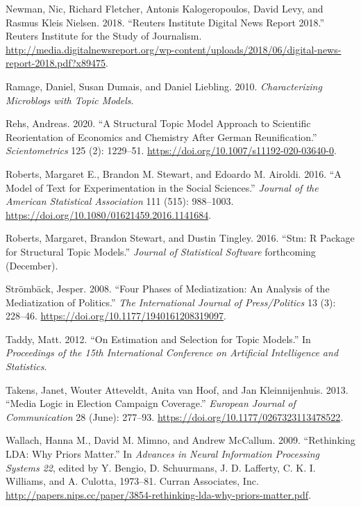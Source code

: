 \documentclass[
]{article}
\begin{document}
\leavevmode\hypertarget{ref-newman_reuters_2018}{}%
Newman, Nic, Richard Fletcher, Antonis Kalogeropoulos, David Levy, and
Rasmus Kleis Nielsen. 2018. ``Reuters Institute Digital News Report
2018.'' Reuters Institute for the Study of Journalism.
\url{http://media.digitalnewsreport.org/wp-content/uploads/2018/06/digital-news-report-2018.pdf?x89475}.

\leavevmode\hypertarget{ref-ramage_characterizing_2010}{}%
Ramage, Daniel, Susan Dumais, and Daniel Liebling. 2010.
\emph{Characterizing Microblogs with Topic Models}.

\leavevmode\hypertarget{ref-rehs_structural_2020}{}%
Rehs, Andreas. 2020. ``A Structural Topic Model Approach to Scientific
Reorientation of Economics and Chemistry After German Reunification.''
\emph{Scientometrics} 125 (2): 1229--51.
\url{https://doi.org/10.1007/s11192-020-03640-0}.

\leavevmode\hypertarget{ref-roberts_model_2016}{}%
Roberts, Margaret E., Brandon M. Stewart, and Edoardo M. Airoldi. 2016.
``A Model of Text for Experimentation in the Social Sciences.''
\emph{Journal of the American Statistical Association} 111 (515):
988--1003. \url{https://doi.org/10.1080/01621459.2016.1141684}.

\leavevmode\hypertarget{ref-roberts_stm:_2016}{}%
Roberts, Margaret, Brandon Stewart, and Dustin Tingley. 2016. ``Stm: R
Package for Structural Topic Models.'' \emph{Journal of Statistical
Software} forthcoming (December).

\leavevmode\hypertarget{ref-stromback_four_2008}{}%
Strömbäck, Jesper. 2008. ``Four Phases of Mediatization: An Analysis of
the Mediatization of Politics.'' \emph{The International Journal of
Press/Politics} 13 (3): 228--46.
\url{https://doi.org/10.1177/1940161208319097}.

\leavevmode\hypertarget{ref-taddy_estimation_2012}{}%
Taddy, Matt. 2012. ``On Estimation and Selection for Topic Models.'' In
\emph{Proceedings of the 15th International Conference on Artificial
Intelligence and Statistics}.

\leavevmode\hypertarget{ref-takens_media_2013}{}%
Takens, Janet, Wouter Atteveldt, Anita van Hoof, and Jan Kleinnijenhuis.
2013. ``Media Logic in Election Campaign Coverage.'' \emph{European
Journal of Communication} 28 (June): 277--93.
\url{https://doi.org/10.1177/0267323113478522}.

\leavevmode\hypertarget{ref-wallach_rethinking_2009}{}%
Wallach, Hanna M., David M. Mimno, and Andrew McCallum. 2009.
``Rethinking LDA: Why Priors Matter.'' In \emph{Advances in Neural
Information Processing Systems 22}, edited by Y. Bengio, D. Schuurmans,
J. D. Lafferty, C. K. I. Williams, and A. Culotta, 1973--81. Curran
Associates, Inc.
\url{http://papers.nips.cc/paper/3854-rethinking-lda-why-priors-matter.pdf}.
\end{document}

